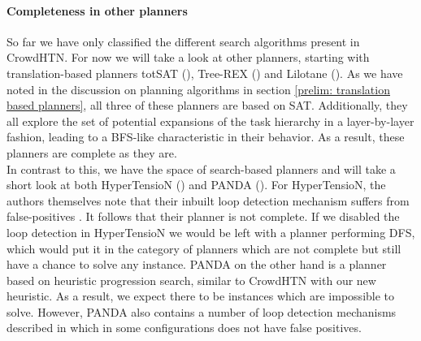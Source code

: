 \paragraph{Completeness in other planners}
So far we have only classified the different search algorithms present in CrowdHTN. For now we will take a look at other planners, starting with translation-based planners totSAT (\cite{behnke2018totsat}), Tree-REX (\cite{schreiber2019tree}) and Lilotane (\cite{schreiber2021lilotane}). As we have noted in the discussion on planning algorithms in section \ref{prelim: translation based planners}, all three of these planners are based on SAT. Additionally, they all explore the set of potential expansions of the task hierarchy in a layer-by-layer fashion, leading to a BFS-like characteristic in their behavior. As a result, these planners are complete as they are. \\
In contrast to this, we have the space of search-based planners and will take a short look at both HyperTensioN (\cite{magnaguagno2020hypertension}) and PANDA (\cite{holler2020htn}). For HyperTensioN, the authors themselves note that their inbuilt loop detection mechanism suffers from false-positives \cite{magnaguagno2020hypertension}. It follows that their planner is not complete. If we disabled the loop detection in HyperTensioN we would be left with a planner performing DFS, which would put it in the category of planners which are not complete but still have a chance to solve any instance. PANDA on the other hand is a planner based on heuristic progression search, similar to CrowdHTN with our new heuristic. As a result, we expect there to be instances which are impossible to solve. However, PANDA also contains a number of loop detection mechanisms described in \cite{holler2021loop} which in some configurations does not have false positives.

